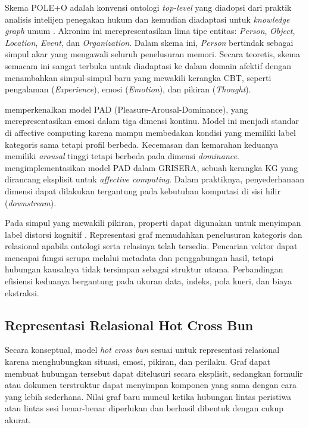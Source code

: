Skema POLE+O adalah konvensi ontologi \textit{top-level} yang diadopsi dari praktik analisis intelijen penegakan hukum dan kemudian diadaptasi untuk \textit{knowledge graph} umum \parencite{neo4jPoleO2024}. Akronim ini merepresentasikan lima tipe entitas: \textit{Person}, \textit{Object}, \textit{Location}, \textit{Event}, dan \textit{Organization}. Dalam skema ini, \textit{Person} bertindak sebagai simpul akar yang mengawali seluruh penelusuran memori. Secara teoretis, skema semacam ini sangat terbuka untuk diadaptasi ke dalam domain afektif dengan menambahkan simpul-simpul baru yang mewakili kerangka CBT, seperti pengalaman (\textit{Experience}), emosi (\textit{Emotion}), dan pikiran (\textit{Thought}).

\textcite{mehrabianRussell1974} memperkenalkan model PAD (Pleasure-Arousal-Dominance), yang merepresentasikan emosi dalam tiga dimensi kontinu. Model ini menjadi standar di affective computing karena mampu membedakan kondisi yang memiliki label kategoris sama tetapi profil berbeda. Kecemasan dan kemarahan keduanya memiliki \textit{arousal} tinggi tetapi berbeda pada dimensi \textit{dominance}. \textcite{grochla2021grisera} mengimplementasikan model PAD dalam GRISERA, sebuah kerangka KG yang dirancang eksplisit untuk \textit{affective computing}. Dalam praktiknya, penyederhanaan dimensi dapat dilakukan tergantung pada kebutuhan komputasi di sisi hilir (\textit{downstream}).

Pada simpul yang mewakili pikiran, properti dapat digunakan untuk menyimpan label distorsi kognitif \parencite{beck1979}. Representasi graf memudahkan penelusuran kategoris dan relasional apabila ontologi serta relasinya telah tersedia. Pencarian vektor dapat mencapai fungsi serupa melalui metadata dan penggabungan hasil, tetapi hubungan kausalnya tidak tersimpan sebagai struktur utama. Perbandingan efisiensi keduanya bergantung pada ukuran data, indeks, pola kueri, dan biaya ekstraksi.

\subsection{Representasi Relasional Hot Cross Bun}
\label{subsec:hot-cross-bun-kg}

Secara konseptual, model \textit{hot cross bun} \parencite{greenbergerPadesky1995} sesuai untuk representasi relasional karena menghubungkan situasi, emosi, pikiran, dan perilaku. Graf dapat membuat hubungan tersebut dapat ditelusuri secara eksplisit, sedangkan formulir atau dokumen terstruktur dapat menyimpan komponen yang sama dengan cara yang lebih sederhana. Nilai graf baru muncul ketika hubungan lintas peristiwa atau lintas sesi benar-benar diperlukan dan berhasil dibentuk dengan cukup akurat.

